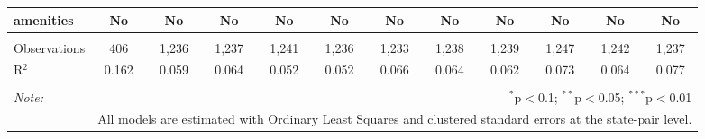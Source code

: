 \begin{table}[!htbp]
\begin{tabular}{@{\extracolsep{5pt}}lccccccccccc}
amenities & No & No & No & No & No & No & No & No & No & No & No \\ 
\hline \\[-1.8ex] 
Observations & 406 & 1,236 & 1,237 & 1,241 & 1,236 & 1,233 & 1,238 & 1,239 & 1,247 & 1,242 & 1,237 \\ 
R$^{2}$ & 0.162 & 0.059 & 0.064 & 0.052 & 0.052 & 0.066 & 0.064 & 0.062 & 0.073 & 0.064 & 0.077 \\ 
\hline 
\hline \\[-1.8ex] 
\textit{Note:}  & \multicolumn{11}{r}{$^{*}$p$<$0.1; $^{**}$p$<$0.05; $^{***}$p$<$0.01} \\ 
 & \multicolumn{11}{r}{All models are estimated with Ordinary Least Squares and clustered standard errors at the state-pair level.} \\ 
\end{tabular} 
\end{table} 
